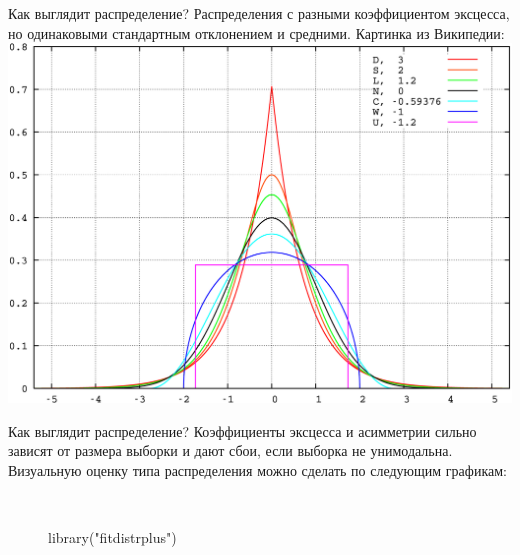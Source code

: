 \begin{frame}{Как выглядит распределение?}
Распределения с разными коэффициентом эксцесса, но одинаковыми стандартным отклонением и средними. Картинка из Википедии:\\
\includegraphics[width=0.8\linewidth]{kurt.png}
\end{frame}
\begin{frame}{Как выглядит распределение?}
Коэффициенты эксцесса и асимметрии сильно зависят от размера выборки и дают сбои, если выборка не унимодальна. Визуальную оценку типа распределения можно сделать по следующим графикам:\\
\begin{figure}
  \centering
  \caption{library("fitdistrplus")}
  ~
\end{figure}
\end{frame}
